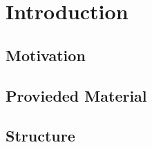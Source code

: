 \chapter{Introduction}



\section{Motivation}


\section{Provieded Material}


\section{Structure}

